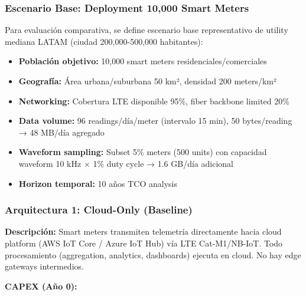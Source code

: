 \subsubsection{Escenario Base: Deployment 10,000 Smart Meters}

Para evaluación comparativa, se define escenario base representativo de utility mediana LATAM (ciudad 200,000-500,000 habitantes):

\begin{itemize}
\item \textbf{Población objetivo:} 10,000 smart meters residenciales/comerciales
\item \textbf{Geografía:} Área urbana/suburbana 50 km², densidad 200 meters/km²
\item \textbf{Networking:} Cobertura LTE disponible 95\%, fiber backbone limited 20\%
\item \textbf{Data volume:} 96 readings/día/meter (intervalo 15 min), 50 bytes/reading → 48 MB/día agregado
\item \textbf{Waveform sampling:} Subset 5\% meters (500 units) con capacidad waveform 10 kHz $\times$ 1\% duty cycle → 1.6 GB/día adicional
\item \textbf{Horizon temporal:} 10 años TCO analysis
\end{itemize}

\subsubsection{Arquitectura 1: Cloud-Only (Baseline)}

\textbf{Descripción:} Smart meters transmiten telemetría directamente hacia cloud platform (AWS IoT Core / Azure IoT Hub) vía LTE Cat-M1/NB-IoT. Todo procesamiento (aggregation, analytics, dashboards) ejecuta en cloud. No hay edge gateways intermedios.

\textbf{CAPEX (Año 0):}

